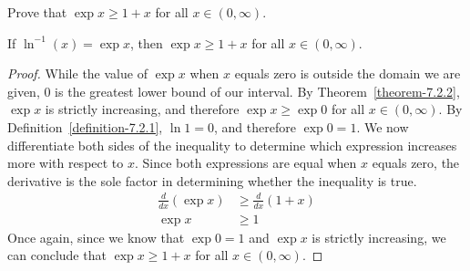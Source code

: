 \begin{exercise}
	Prove that $\exp x \geq 1 + x$ for all $x \in \left( 0, \infty \right)$.
\end{exercise}
\begin{proposition}
	If $\ln^{-1}\left(x\right) = \exp x$, then $\exp x \geq 1 + x$ for all $x \in \left( 0, \infty \right)$.
\end{proposition}
\begin{proof}
	While the value of $\exp x$ when $x$ equals zero is outside the domain we are given, $0$ is the greatest lower bound of our interval. By Theorem~\ref{theorem-7.2.2}, $\exp x$ is strictly increasing, and therefore $\exp x \geq \exp 0$ for all $x \in \left( 0, \infty \right)$.
	\newline\newline
	By Definition~\ref{definition-7.2.1}, $\ln 1 = 0$, and therefore $\exp 0 = 1$. We now differentiate both sides of the inequality to determine which expression increases more with respect to $x$. Since both expressions are equal when $x$ equals zero, the derivative is the sole factor in determining whether the inequality is true.
	\begin{align*}
	\frac{d}{dx}\left(\exp x\right) &\geq \frac{d}{dx}\left(1+x\right)\\
	\exp x &\geq 1
	\end{align*}
	Once again, since we know that $\exp 0 = 1$ and $\exp x$ is strictly increasing, we can conclude that $\exp x \geq 1 + x$ for all $x \in \left( 0, \infty \right)$.
\end{proof}
